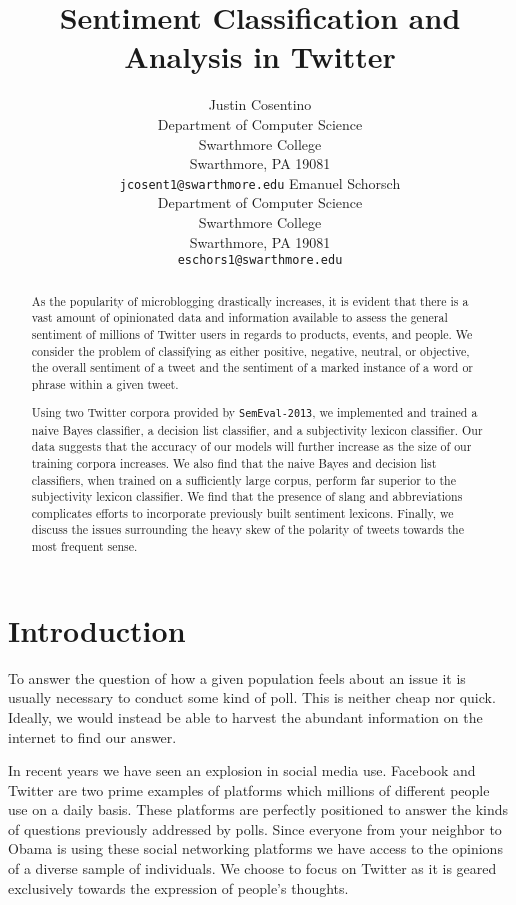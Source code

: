 \documentclass[11pt]{article}
\title{Sentiment Classification and Analysis in Twitter}
\author{Justin Cosentino\\
  Department of Computer Science\\
  Swarthmore College\\
  Swarthmore, PA 19081\\
  {\tt jcosent1@swarthmore.edu}  
  \And                            
  Emanuel Schorsch\\                 
  Department of Computer Science\\
  Swarthmore College\\
  Swarthmore, PA 19081\\
  {\tt eschors1@swarthmore.edu}}
\date{}
\begin{document}
\maketitle
\begin{abstract}
As the popularity of microblogging drastically increases, it is evident that there is a vast amount of opinionated data and information available to assess the general sentiment of millions of Twitter users in regards to products, events, and people. We consider the problem of classifying as either positive, negative, neutral, or objective, the overall sentiment of a tweet and the sentiment of a marked instance of a word or phrase within a given tweet. 

Using two Twitter corpora provided by {\tt SemEval-2013}, we implemented and trained a naive Bayes classifier, a decision list classifier, and a subjectivity lexicon classifier. Our data suggests that the accuracy of our models will further increase as the size of our training corpora increases. We also find that the naive Bayes and decision list classifiers, when trained on a sufficiently large corpus, perform far superior to the subjectivity lexicon classifier. We find that the presence of slang and abbreviations complicates efforts to incorporate previously built sentiment lexicons. Finally, we discuss the issues surrounding the heavy skew of the polarity of tweets towards the most frequent sense.
\end{abstract}

\section{Introduction}
To answer the question of how a given population feels about an issue it is usually necessary to conduct some kind of poll. This is neither cheap nor quick. Ideally, we would instead be able to harvest the abundant information on the internet to find our answer. 

In recent years we have seen an explosion in social media use. Facebook and Twitter are two prime examples of platforms which millions of different people use on a daily basis. These platforms are perfectly positioned to answer the kinds of questions previously addressed by polls. Since everyone from your neighbor to Obama is using these social networking platforms we have access to the opinions of a diverse sample of individuals. We choose to focus on Twitter as it is geared exclusively towards the expression of people's thoughts.  
\end{document}
